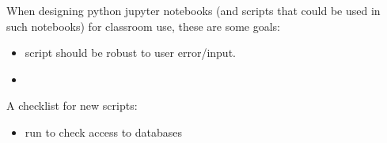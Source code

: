 \documentclass[12pt]{article}
\begin{document}
When designing python jupyter notebooks (and scripts that could be used in such notebooks) for classroom use, these are some goals:
%
\begin{itemize}
  \item script should be robust to user error/input.
  \item 
\end{itemize}
%

A checklist for new scripts:
%
\begin{itemize}
\item run to check access to databases
\end{itemize}
\end{document}
